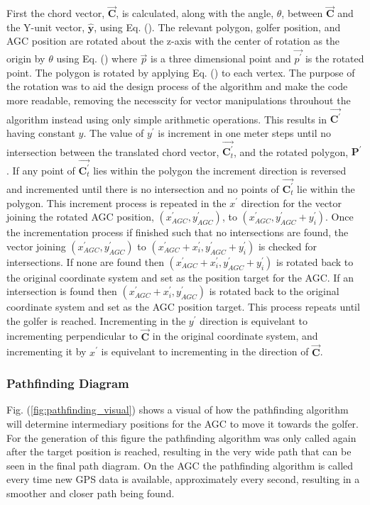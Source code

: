 \documentclass[11pt,landscape]{article}
\begin{document}
\begin{multicols}{3}
First the chord vector, $\overrightarrow{\mathbf{C}}$, is calculated, along with
the angle, $\theta$, between $\overrightarrow{\mathbf{C}}$ and the Y-unit
vector, $\hat{\mathbf{y}}$, using Eq. ().  The relevant polygon, golfer
position, and AGC position are rotated about the z-axis with the center of
rotation as the origin by $\theta$ using Eq. () where $\overrightarrow{p}$ is a
three dimensional point and $\overrightarrow{p^\prime}$ is the rotated point.
The polygon is rotated by applying Eq. () to each vertex. The purpose of the
rotation was to aid the design process of the algorithm and make the code more
readable, removing the necesscity for vector manipulations throuhout the
algorithm instead using only simple arithmetic operations. This results in
$\overrightarrow{\mathbf{C}^\prime}$ having constant $y$. The value of
$y^\prime$ is increment in one meter steps until no intersection between the
translated chord vector, $\overrightarrow{\mathbf{C}^\prime_t}$, and the rotated
polygon, $\mathbf{P}^\prime$. If any point of
$\overrightarrow{\mathbf{C}^\prime_t}$ lies within the polygon the increment
direction is reversed and incremented until there is no intersection and no
points of $\overrightarrow{\mathbf{C}^\prime_t}$ lie within the polygon. This
increment process is repeated in the $x^\prime$ direction for the vector joining
the rotated AGC position, $\left(x^\prime_{AGC}, y^\prime_{AGC}\right)$, to
$\left(x^\prime_{AGC}, y^\prime_{AGC} + y^\prime_i\right)$. Once the
incrementation process if finished such that no intersections are found, the
vector joining $\left(x^\prime_{AGC}, y^\prime_{AGC}\right)$ to
$\left(x^\prime_{AGC}+x^\prime_i, y^\prime_{AGC} + y^\prime_i\right)$ is checked
for intersections. If none are found then $\left(x^\prime_{AGC}+x^\prime_i,
y^\prime_{AGC} + y^\prime_i\right)$ is rotated back to the original coordinate
system and set as the position target for the AGC. If an intersection is found
then $\left(x^\prime_{AGC}+x^\prime_i, y^\prime_{AGC}\right)$ is rotated back to
the original coordinate system and set as the AGC position target. This process
repeats until the golfer is reached. Incrementing in the $y^\prime$ direction is
equivelant to incrementing perpendicular to $\overrightarrow{\mathbf{C}}$ in the
original coordinate system, and incrementing it by $x^\prime$ is equivelant to
incrementing in the direction of $\overrightarrow{\mathbf{C}}$.
\subsubsection{Pathfinding Diagram}
Fig. (\ref{fig:pathfinding_visual}) shows a visual of how the pathfinding
algorithm will determine intermediary positions for the AGC to move it towards
the golfer. For the generation of this figure the pathfinding algorithm was only
called again after the target position is reached, resulting in the very wide
path that can be seen in the final path diagram. On the AGC the pathfinding
algorithm is called every time new GPS data is available, approximately every
second, resulting in a smoother and closer path being found.
\end{multicols}
\end{document}
